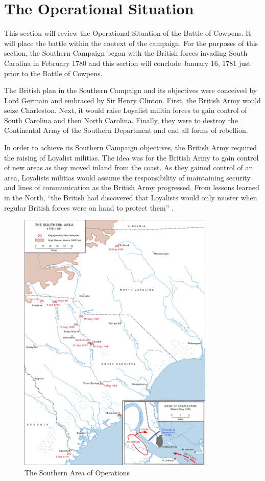 \section{The Operational Situation}

This section will review the Operational Situation of the Battle of Cowpens.  It
will place the battle within the context of the campaign.   For the purposes of
this section, the Southern Campaign began with the British forces invading South
Carolina in February 1780 and this section will conclude January 16, 1781 just
prior to the Battle of Cowpens.

The British plan in the Southern Campaign and its objectives were conceived by
Lord Germain and embraced by Sir Henry Clinton.  First, the British Army would
seize Charleston.  Next, it would raise Loyalist militia forces to gain control
of South Carolina and then North Carolina.  Finally, they were to destroy the
Continental Army of the Southern Department and end all forms of rebellion.

In order to achieve its Southern Campaign objectives, the British Army required
the raising of Loyalist militias.  The idea was for the British Army to gain
control of new areas as they moved inland from the coast.  As they gained
control of an area, Loyalists militias would assume the responsibility of
maintaining security and lines of communication as the British Army progressed.
From lessons learned in the North, “the British had discovered that Loyalists
would only muster when regular British forces were on hand to protect them”
\cite[p.43]{woodward_comparative_2002}.

\begin{figure}[ht]
\begin{center}
\includegraphics[height=5in]{gfx/Nicholson1}
\end{center}
\caption{The Southern Area of Operations \cite[Map 10, p. 91]{stewart_2005}}
\label{Nicholson1}
\end{figure}

